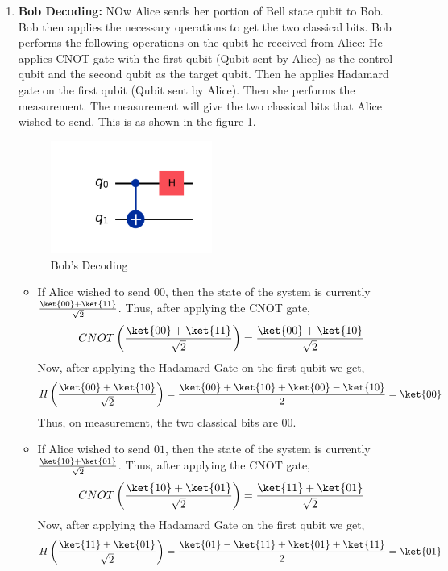 \documentclass[12pt, oneside]{book}
\theoremstyle{definition}
\theoremstyle{definition}
\theoremstyle{remark}
\begin{document}
\begin{enumerate}
\begin{itemize}
    \end{itemize}
    \item \textbf{Bob Decoding: }NOw Alice sends her portion of Bell state qubit to Bob. Bob then applies the necessary operations to get the two classical bits.
    Bob performs the following operations on the qubit he received from Alice:
    He applies CNOT gate with the first qubit (Qubit sent by Alice) as the control qubit and the second qubit as the target qubit. Then he applies Hadamard gate on the first qubit (Qubit sent by Alice).
    Then she performs the measurement. The measurement will give the two classical bits that Alice wished to send.
    This is as shown in the figure \ref{fig:superdense3}.
    \begin{figure}[H]
        \centering
        \includegraphics[width=0.5\textwidth]{../images/superdense-coding3.png}
        \caption{Bob's Decoding}
        \label{fig:superdense3}
    \end{figure}
    \begin{itemize}
        \item If Alice wished to send $00$, then the state of the system is currently $\frac{\ket{00}+\ket{11}}{\sqrt{2}}$. Thus, after applying the CNOT gate,
        \[
            CNOT\left(\frac{\ket{00}+\ket{11}}{\sqrt{2}}\right)=\frac{\ket{00}+\ket{10}}{\sqrt{2}}
        \]
        Now, after applying the Hadamard Gate on the first qubit we get,
        \[
            H\left(\frac{\ket{00}+\ket{10}}{\sqrt{2}}\right)=\frac{\ket{00}+\ket{10}+\ket{00}-\ket{10}}{2}=\ket{00}
        \]
        Thus, on measurement, the two classical bits are $00$.
        \item If Alice wished to send $01$, then the state of the system is currently $\frac{\ket{10}+\ket{01}}{\sqrt{2}}$. Thus, after applying the CNOT gate,
        \[
            CNOT\left(\frac{\ket{10}+\ket{01}}{\sqrt{2}}\right)=\frac{\ket{11}+\ket{01}}{\sqrt{2}}
        \]
        Now, after applying the Hadamard Gate on the first qubit we get,
        \[
            H\left(\frac{\ket{11}+\ket{01}}{\sqrt{2}}\right)=\frac{\ket{01}-\ket{11}+\ket{01}+\ket{11}}{2}=\ket{01}
\]
\end{itemize}
\end{enumerate}
\end{document}

